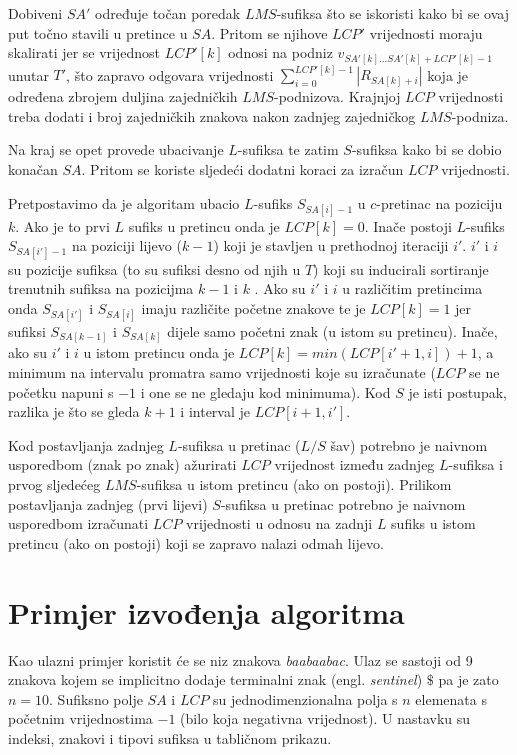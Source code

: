 \documentclass[times, utf8, proizvoljni, numeric]{fer}
\begin{document}
Dobiveni $SA'$ određuje točan poredak $LMS$-sufiksa što se iskoristi kako bi se ovaj put točno stavili u pretince u $SA$. Pritom se njihove $LCP'$ vrijednosti moraju skalirati jer se vrijednost $LCP'[k]$ odnosi na podniz $v_{SA'[k]...SA'[k]+LCP'[k]-1}$ unutar $T'$, što zapravo odgovara vrijednosti $\sum_{i=0}^{LCP'[k]-1}|R_{SA[k]+i}|$ koja je određena zbrojem duljina zajedničkih $LMS$-podnizova. Krajnjoj $LCP$ vrijednosti treba dodati i broj zajedničkih znakova nakon zadnjeg zajedničkog $LMS$-podniza.

Na kraj se opet provede ubacivanje $L$-sufiksa te zatim $S$-sufiksa kako bi se dobio konačan $SA$. Pritom se koriste sljedeći dodatni koraci za izračun $LCP$ vrijednosti.

Pretpostavimo da je algoritam ubacio $L$-sufiks $S_{SA[i]-1}$ u $c$-pretinac na poziciju $k$. Ako je to prvi $L$ sufiks u pretincu onda je $LCP[k]=0$. Inače postoji $L$-sufiks $S_{SA[i']-1}$ na poziciji lijevo ($k-1$) koji je stavljen u prethodnoj iteraciji $i'$. $i'$ i $i$ su pozicije sufiksa (to su sufiksi desno od njih u $T$) koji su inducirali sortiranje trenutnih sufiksa na pozicijma $k-1$ i $k$ . Ako su $i'$ i $i$ u različitim pretincima onda $S_{SA[i']}$ i $S_{SA[i]}$ imaju različite početne znakove te je $LCP[k]=1$ jer sufiksi $S_{SA[k-1]}$ i $S_{SA[k]}$ dijele samo početni znak (u istom su pretincu). Inače, ako su $i'$ i $i$ u istom pretincu onda je $LCP[k]=min(LCP[i'+1,i])+1$, a minimum na intervalu promatra samo vrijednosti koje su izračunate ($LCP$ se ne početku napuni s $-1$ i one se ne gledaju kod minimuma). Kod $S$ je isti postupak, razlika je što se gleda $k+1$ i interval je $LCP[i+1,i']$.

Kod postavljanja zadnjeg $L$-sufiksa u pretinac ($L/S$ šav) potrebno je naivnom usporedbom (znak po znak) ažurirati $LCP$ vrijednost između zadnjeg $L$-sufiksa i prvog sljedećeg $LMS$-sufiksa u istom pretincu (ako on postoji). Prilikom postavljanja zadnjeg (prvi lijevi) $S$-sufiksa u pretinac potrebno je naivnom usporedbom izračunati $LCP$ vrijednosti u odnosu na zadnji $L$ sufiks u istom pretincu (ako on postoji) koji se zapravo nalazi odmah lijevo.

\chapter{Primjer izvođenja algoritma}

Kao ulazni primjer koristit će se niz znakova \textit{baabaabac}. Ulaz se sastoji od 9 znakova kojem se implicitno dodaje terminalni znak (engl. \textit{sentinel}) $\$$ pa je zato $n=10$. Sufiksno polje $SA$ i $LCP$ su jednodimenzionalna polja s $n$ elemenata s početnim vrijednostima $-1$ (bilo koja negativna vrijednost). U nastavku su indeksi, znakovi i tipovi sufiksa u tabličnom prikazu.
\end{document}
